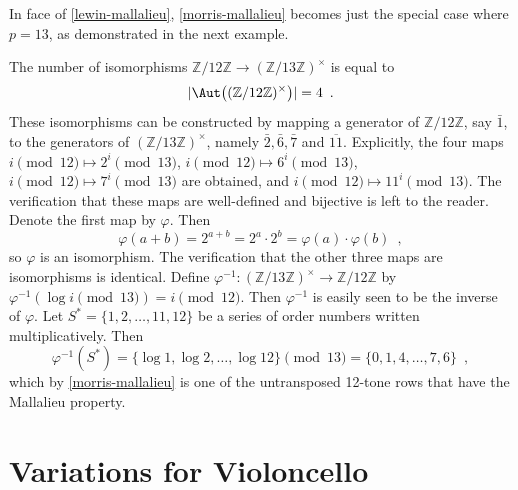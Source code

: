 In face of \ref{lewin-mallalieu}, \ref{morris-mallalieu} becomes just the special case where $p = 13$, as demonstrated in the next example.

\begin{example}
	\cite[8]{Lewin1976a}
	\cite[9]{Babbitt1976}
	The number of isomorphisms $\mathbb{Z} / 12 \mathbb{Z} \to (\mathbb{Z} / 13 \mathbb{Z})^\times$ is equal to
	\begin{equation}
		|\Aut\big((\mathbb{Z} / 12 \mathbb{Z})^\times\big)| = 4 \enspace.
	\end{equation}
	These isomorphisms can be constructed by mapping a generator of $\mathbb{Z} / 12 \mathbb{Z}$, say $\bar{1}$, to the generators of $(\mathbb{Z} / 13 \mathbb{Z})^\times$, namely $\bar{2}, \bar{6}, \bar{7}$ and $\overline{11}$. Explicitly, the four maps $i \pmod{12} \mapsto 2^i \pmod{13}$, $i \pmod{12} \mapsto 6^i \pmod{13}$, $i \pmod{12} \mapsto 7^i \pmod{13}$ are obtained, and $i \pmod{12} \mapsto 11^i \pmod{13}$. The verification that these maps are well-defined and bijective is left to the reader. Denote the first map by $\varphi$. Then
	\begin{equation}
		\varphi(a + b) = 2^{a + b} = 2^a \cdot 2^b = \varphi(a) \cdot \varphi(b) \enspace,
	\end{equation}
	so $\varphi$ is an isomorphism. The verification that the other three maps are isomorphisms is identical. Define $\varphi^{-1} : (\mathbb{Z} / 13 \mathbb{Z})^\times \to \mathbb{Z} / 12 \mathbb{Z}$ by $\varphi^{-1}(\log i \pmod{13}) = i \pmod{12}$. Then $\varphi^{-1}$ is easily seen to be the inverse of $\varphi$. Let $S^* = \{ 1, 2, \dots, 11, 12 \}$ be a series of order numbers written multiplicatively. Then
	\begin{equation}
		\varphi^{-1}(S^*) = \{ \log 1, \log 2, \dots, \log 12 \} \pmod{13} = \{ 0, 1, 4, \dots, 7, 6 \} \enspace,
	\end{equation}
	which by \ref{morris-mallalieu} is one of the untransposed 12-tone rows that have the Mallalieu property.
\end{example}

\chapter{Variations for Violoncello}

